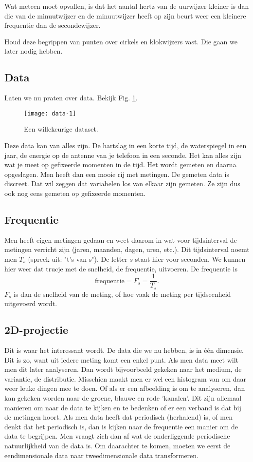 \documentclass[11pt,fleqn]{book} %
\begin{document}
Wat meteen moet opvallen, is dat het aantal hertz van de uurwijzer kleiner is dan die van de minuutwijzer en de minuutwijzer heeft op zijn beurt weer een kleinere frequentie dan de secondewijzer.

Houd deze begrippen van punten over cirkels en klokwijzers vast. Die gaan we later nodig hebben.

\subsection{Data}
Laten we nu praten over data. Bekijk Fig. \ref{fig:data-1}. 
\begin{figure}[h]
	\centering\texttt{[image: data-1]}
	\caption{Een willekeurige dataset.}
	\label{fig:data-1}
\end{figure}

Deze data kan van alles zijn. De hartslag in een korte tijd, de waterspiegel in een jaar, de energie op de antenne van je telefoon in een seconde. Het kan alles zijn wat je meet op gefixeerde momenten in de tijd. Het wordt gemeten en daarna opgeslagen. Men heeft dan een mooie rij met metingen. De gemeten data is discreet. Dat wil zeggen dat variabelen los van elkaar zijn gemeten. Ze zijn dus ook nog eens gemeten op gefixeerde momenten.

\subsection{Frequentie}
Men heeft eigen metingen gedaan en weet daarom in wat voor tijdsinterval de metingen verricht zijn (jaren, maanden, dagen, uren, etc.). Dit tijdsinterval noemt men $T_s$ (spreek uit: "t's van s"). De letter $s$ staat hier voor seconden. We kunnen hier weer dat trucje met de snelheid, de frequentie, uitvoeren. De frequentie is
\begin{displaymath}
	\text{frequentie}=F_s=\frac{1}{T_s}.
\end{displaymath}
$F_s$ is dan de snelheid van de meting, of hoe vaak de meting per tijdseenheid uitgevoerd wordt.

\subsection{2D-projectie}
Dit is waar het interessant wordt. De data die we nu hebben, is in één dimensie. Dit is zo, want uit iedere meting komt een enkel punt. Als men data meet wilt men dit later analyseren. Dan wordt bijvoorbeeld gekeken naar het medium, de variantie, de distributie. Misschien maakt men er wel een histogram van om daar weer leuke dingen mee te doen. Of als er een afbeelding is om te analyseren, dan kan gekeken worden naar de groene, blauwe en rode 'kanalen'. Dit zijn allemaal manieren om naar de data te kijken en te bedenken of er een verband is dat bij de metingen hoort. Als men data heeft dat periodisch (herhalend) is, of men denkt dat het periodisch is, dan is kijken naar de frequentie een manier om de data te begrijpen. Men vraagt zich dan af wat de onderliggende periodische natuurlijkheid van de data is. Om daarachter te komen, moeten we eerst de eendimensionale data naar tweedimensionale data transformeren.
\end{document}
